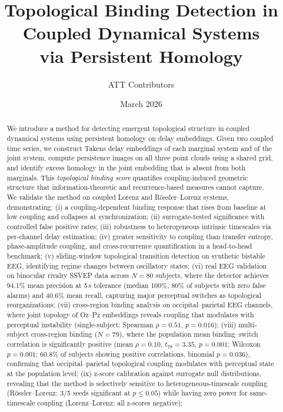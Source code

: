 \documentclass[11pt,a4paper]{article}
\title{Topological Binding Detection in Coupled Dynamical Systems\\via Persistent Homology}
\author{ATT Contributors}
\date{March 2026}
\begin{document}
\maketitle

\begin{abstract}
We introduce a method for detecting emergent topological structure in coupled dynamical systems using persistent homology on delay embeddings.
Given two coupled time series, we construct Takens delay embeddings of each marginal system and of the joint system, compute persistence images on all three point clouds using a shared grid, and identify excess homology in the joint embedding that is absent from both marginals.
This \emph{topological binding score} quantifies coupling-induced geometric structure that information-theoretic and recurrence-based measures cannot capture.
We validate the method on coupled Lorenz and R\"ossler--Lorenz systems, demonstrating: (i) a coupling-dependent binding response that rises from baseline at low coupling and collapses at synchronization; (ii) surrogate-tested significance with controlled false positive rates; (iii) robustness to heterogeneous intrinsic timescales via per-channel delay estimation; (iv) greater sensitivity to coupling than transfer entropy, phase-amplitude coupling, and cross-recurrence quantification in a head-to-head benchmark; (v) sliding-window topological transition detection on synthetic bistable EEG, identifying regime changes between oscillatory states; (vi) real EEG validation on binocular rivalry SSVEP data \citep{nie2023accumulating} across $N = 80$ subjects, where the detector achieves $94.1\%$ mean precision at 5\,s tolerance (median 100\%, 80\% of subjects with zero false alarms) and $40.6\%$ mean recall, capturing major perceptual switches as topological reorganizations; (vii) cross-region binding analysis on occipital--parietal EEG channels, where joint topology of Oz--Pz embeddings reveals coupling that modulates with perceptual instability (single-subject: Spearman $\rho = 0.51$, $p = 0.016$);
(viii) multi-subject cross-region binding ($N = 79$), where the population mean binding--switch correlation is significantly positive (mean $\rho = 0.10$, $t_{78} = 3.35$, $p = 0.001$; Wilcoxon $p = 0.001$; 60.8\% of subjects showing positive correlations, binomial $p = 0.036$), confirming that occipital--parietal topological coupling modulates with perceptual state at the population level;
(ix) z-score calibration against surrogate null distributions, revealing that the method is selectively sensitive to heterogeneous-timescale coupling (R\"ossler--Lorenz: 3/5 seeds significant at $p \leq 0.05$) while having zero power for same-timescale coupling (Lorenz--Lorenz: all z-scores negative);

\end{abstract}
\end{document}
